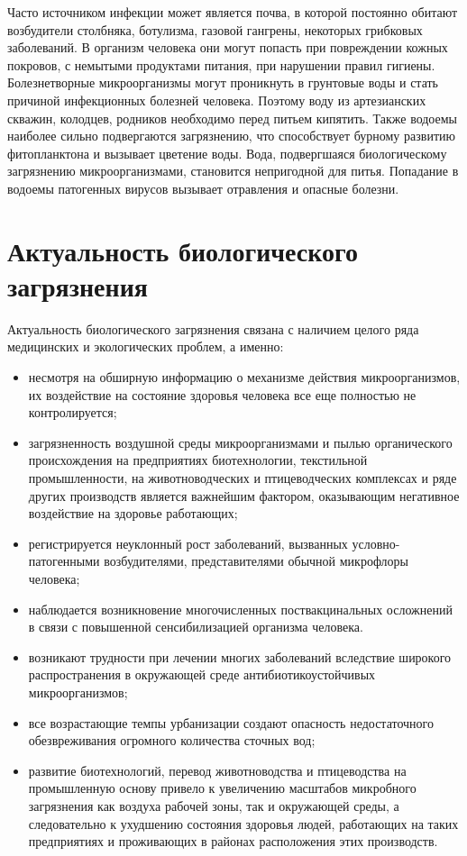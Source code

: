 \documentclass[a4paper, 12pt]{extarticle}
\begin{document}
Часто источником инфекции может является почва, в которой постоянно обитают возбудители столбняка, ботулизма, газовой гангрены, некоторых грибковых заболеваний. В организм человека они могут попасть при повреждении кожных покровов, с немытыми продуктами питания, при нарушении правил гигиены. Болезнетворные микроорганизмы могут проникнуть в грунтовые воды и стать причиной инфекционных болезней человека. Поэтому воду из артезианских скважин, колодцев, родников необходимо перед питьем кипятить. Также водоемы наиболее сильно подвергаются загрязнению, что способствует бурному развитию фитопланктона и вызывает цветение воды. Вода, подвергшаяся биологическому загрязнению микроорганизмами, становится непригодной для питья. Попадание в водоемы патогенных вирусов вызывает отравления и опасные болезни.

\section{Актуальность биологического загрязнения}

Актуальность биологического загрязнения связана с наличием целого ряда медицинских и экологических проблем, а именно:
\begin{itemize}
    \item несмотря на обширную информацию о механизме действия микроорганизмов, их воздействие на состояние здоровья человека все еще полностью не контролируется;
    \item загрязненность воздушной среды микроорганизмами и пылью органического происхождения на предприятиях биотехнологии, текстильной промышленности, на животноводческих и птицеводческих комплексах и ряде других производств является важнейшим фактором, оказывающим негативное воздействие на здоровье работающих;
    \item регистрируется неуклонный рост заболеваний, вызванных условно-патогенными возбудителями, представителями обычной микрофлоры человека;
    \item наблюдается возникновение многочисленных поствакцинальных осложнений в связи с повышенной сенсибилизацией организма человека.
    \item возникают трудности при лечении многих заболеваний вследствие широкого распространения в окружающей среде антибиотикоустойчивых микроорганизмов;
    \item все возрастающие темпы урбанизации создают опасность недостаточного обезвреживания огромного количества сточных вод;
    \item развитие биотехнологий, перевод животноводства и птицеводства на промышленную основу привело к увеличению масштабов микробного загрязнения как воздуха рабочей зоны, так и окружающей среды, а следовательно к ухудшению состояния здоровья людей, работающих на таких предприятиях и проживающих в районах расположения этих производств.
\end{itemize}
\end{document}
